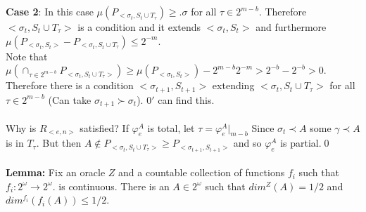 \documentclass{article}
\begin{document}
   \textbf{Case 2}: In this case $\mu(P_{<\sigma_t,S_t\cup T_\tau}) \geq .\sigma$ for all $\tau \in 2^{m-b}$. Therefore $<\sigma_t , S_t\cup T_\tau>$ is a condition and it extends $<\sigma_t,S_t>$ and furthermore $\mu(P_{<\sigma_t,S_t>}- P_{<\sigma_t,S_t\cup T_\tau}) \leq 2^{-m}$. \\
   Note that $\mu(\cap_{\tau \in 2^{m-b} }P_{<\sigma_t,S_t\cup T_\tau>}) \geq \mu(P_{<\sigma_t,S_t>}) - 2^{m-b}2^{-m} > 2^{-b} - 2^{-b} > 0$. \\
   Therefore there is a condition $<\sigma_{t+1}, S_{t+1}>$ extending $<\sigma_t, S_t \cup T_\tau>$ for all $\tau \in 2^{m-b}$ (Can take $\sigma_{t+1} \succ \sigma_t$). $0'$ can find this.\\\\
   Why is $R_{<e,n>}$ satisfied? If $\varphi_e^A$ is total, let $\tau = \varphi^A_e|_{m-b}$ Since $\sigma_t \prec A$ some $\gamma \prec A$ is in $T_\tau$. But then $A \not \in P_{<\sigma_t,S_t\cup T_\tau>} \geq P_{<\sigma_{t+1}, S_{t+1}>}$ and so $\varphi_e^A$ is partial.\qed \\
   \\
   \textbf{Lemma:} Fix an oracle $Z$ and a countable collection of functions $f_i$ such that $f_i: 2^\omega \to 2^\omega$. is continuous. There is an $A \in 2^\omega$ such that $dim^Z(A) = 1/2$ and $dim^{f_i}(f_i(A)) \leq 1/2$.
   
    
\end{document}
